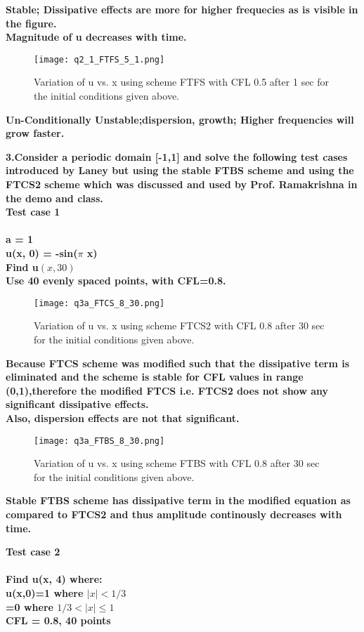 \documentclass{article}
\begin{document}
\textbf{Stable; Dissipative effects are more for higher frequecies as is visible in the figure.
\\ Magnitude of u decreases with time.}

\begin{figure}[H] \label{figure}
\texttt{[image: q2\_1\_FTFS\_5\_1.png]}
\caption{Variation of u vs. x using scheme FTFS with CFL 0.5 after 1 sec for the initial conditions given above.}
\label{figure:}
\end{figure}
\textbf{Un-Conditionally Unstable;dispersion, growth; Higher frequencies will grow faster.}

\newpage
\textbf{3.Consider a periodic domain [-1,1] and solve the following test cases introduced by Laney but using the stable FTBS scheme and using the FTCS2 scheme which was discussed and used by Prof. Ramakrishna in the demo and class.
\\Test case 1
\\
\\a = 1
\\u(x, 0) = -sin($\pi$ x)
\\Find u$(x, 30)$
\\Use 40 evenly spaced points, with CFL=0.8.}

\begin{figure}[H] \label{figure}
\texttt{[image: q3a\_FTCS\_8\_30.png]}
\caption{Variation of u vs. x using scheme FTCS2 with CFL 0.8 after 30 sec for the initial conditions given above.}
\label{figure:}
\end{figure}

\textbf{Because FTCS scheme was modified such that the dissipative term is eliminated and the scheme is stable for CFL values in range (0,1),therefore the modified FTCS i.e. FTCS2 does not show any significant dissipative effects.
\\  Also, dispersion effects are not that significant.}


\begin{figure}[H] \label{figure}
\texttt{[image: q3a\_FTBS\_8\_30.png]}
\caption{Variation of u vs. x using scheme FTBS with CFL 0.8 after 30 sec for the initial conditions given above.}
\label{figure:}
\end{figure}

\textbf{Stable FTBS scheme has dissipative term in the modified equation as compared to FTCS2 and thus amplitude continously decreases with time.}

\newpage

\textbf{Test case 2
\\
\\Find u(x, 4) where:
\\u(x,0)=1 where $|x|<1/3$    \\
        =0 where $1/3<|x| \le 1$
\\CFL = 0.8, 40 points}
\end{document}
